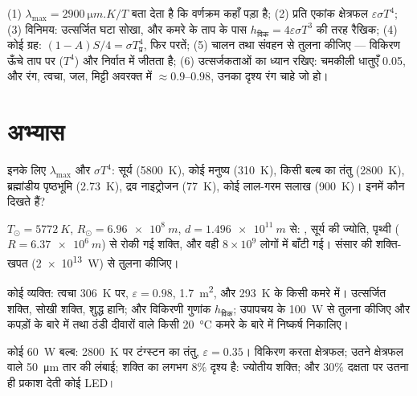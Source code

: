 \begin{method}[विकिरण के आकलन]\label{meth:b2:thermal-radiation:method}
(1) $\lambda_{\max} = \qty{2900}{\micro m.K}/T$ बता देता है कि वर्णक्रम कहाँ
पड़ा है; (2) प्रति एकांक क्षेत्रफल $\varepsilon\sigma T^4$; (3) विनिमय: उत्सर्जित
घटा सोखा, और कमरे के ताप के पास $h_{\text{विक}} = 4\varepsilon\sigma T^3$ की तरह
रैखिक; (4) कोई ग्रह: $(1 - A)S/4 = \sigma T_{\text{प्र}}^4$, फिर
परतें; (5) चालन तथा संवहन से तुलना कीजिए --- विकिरण
ऊँचे ताप पर ($T^4$) और निर्वात में जीतता है; (6) उत्सर्जकताओं का ध्यान रखिए:
चमकीली धातुएँ \qty{0.05}{}, और रंग, त्वचा, जल, मिट्टी अवरक्त में $\approx 0.9$--$0.98$,
उनका दृश्य रंग चाहे जो हो।
\end{method}

\section{अभ्यास}

\begin{exercise}[$\star$]\label{exo:b2:thermal-radiation:1}
इनके लिए $\lambda_{\max}$ और $\sigma T^4$: सूर्य (\qty{5800}{K}), कोई मनुष्य
(\qty{310}{K}), किसी बल्ब का तंतु (\qty{2800}{K}), ब्रह्मांडीय पृष्ठभूमि
(\qty{2.73}{K}), द्रव नाइट्रोजन (\qty{77}{K}), कोई लाल-गरम सलाख
(\qty{900}{K})। इनमें कौन दिखते हैं?
\end{exercise}

\begin{exercise}[$\star$]\label{exo:b2:thermal-radiation:2}
$T_\odot = \qty{5772}{K}$, $R_\odot = \qty{6.96e8}{m}$, $d = \qty{1.496e11}{m}$ से:
, सूर्य की ज्योति, पृथ्वी ($R = \qty{6.37e6}{m}$) से रोकी गई
शक्ति, और वही $8 \times 10^9$
लोगों में बाँटी गई। संसार की शक्ति-खपत (\qty{2e13}{W}) से तुलना कीजिए।
\end{exercise}

\begin{exercise}[$\star$]\label{exo:b2:thermal-radiation:3}
कोई व्यक्ति: त्वचा \qty{306}{K} पर, $\varepsilon = 0.98$, \qty{1.7}{m^2}, और
\qty{293}{K} के किसी कमरे में। उत्सर्जित शक्ति, सोखी शक्ति, शुद्ध हानि; और
विकिरणी गुणांक $h_{\text{विक}}$; उपापचय के \qty{100}{W} से तुलना कीजिए
और कपड़ों के बारे में तथा ठंडी दीवारों वाले किसी \qty{20}{\celsius}
कमरे के बारे में निष्कर्ष निकालिए।
\end{exercise}

\begin{exercise}[$\star$]\label{exo:b2:thermal-radiation:4}
कोई \qty{60}{W} बल्ब: \qty{2800}{K} पर टंग्स्टन का तंतु, $\varepsilon = 0.35$।
विकिरण करता क्षेत्रफल; उतने क्षेत्रफल वाले \qty{50}{\micro m} तार की लंबाई;
शक्ति का लगभग $8\%$ दृश्य है: ज्योतीय शक्ति; और $30\%$ दक्षता पर उतना ही
प्रकाश देती कोई LED।
\end{exercise}

